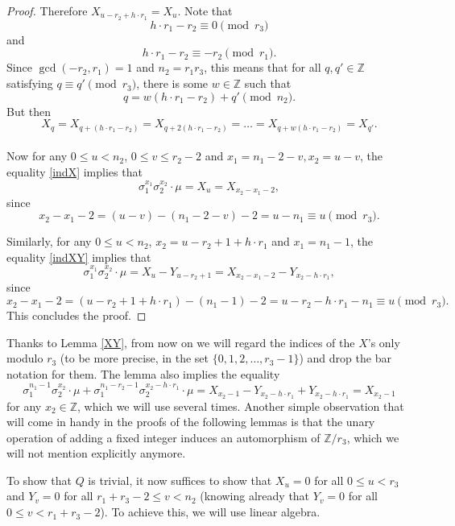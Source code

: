 \documentclass[12pt,a4paper]{article}
\theoremstyle{definition}
\newcommand{\Z}{\mathbb{Z}}
\begin{document}
\begin{proof}
Therefore $X_{u -r_2+h\cdot r_1}=X_u$. Note that $$h\cdot r_1-r_2\equiv 0 \pmod{r_3}$$ and $$h\cdot r_1-r_2\equiv -r_2\pmod{r_1}.$$ Since $\gcd(-r_2,r_1)=1$ and $n_2=r_1r_3$, this means that for all $q,q'\in\Z$ satisfying $q\equiv q'\pmod{r_3}$, there is some $w\in\Z$ such that $$q=w(h\cdot r_1-r_2)+q' \pmod{n_2}.$$ But then $$X_q=X_{q+(h\cdot r_1-r_2)}=X_{q+2(h\cdot r_1-r_2)}=\dots=X_{q+w(h\cdot r_1-r_2)}=X_{q'}.$$

\paragraph*{}
Now for any $0\leq u<n_2$, $0\leq v\leq r_2-2$ and $x_1=n_1-2-v,x_2=u-v$, the equality \eqref{indX} implies that $$\sigma_1^{x_1}\sigma_2^{x_2}\cdot \mu=X_u=X_{x_2-x_1-2},$$ since $$x_2-x_1-2=(u-v)-(n_1-2-v)-2=u-n_1\equiv u\pmod {r_3}.$$

Similarly, for any $0\leq u<n_2$, $x_2=u-r_2+1+h\cdot r_1$ and $x_1=n_1-1$, the equality \eqref{indXY} implies that 
$$\sigma_1^{x_1}\sigma_2^{x_2}\cdot \mu=X_u-Y_{u-r_2+1}=X_{x_2-x_1-2}-Y_{x_2-h\cdot r_1},$$ since 
$$x_2-x_1-2=(u-r_2+1+h\cdot r_1)-(n_1-1)-2=u-r_2-h\cdot r_1-n_1\equiv u \pmod{r_3}.$$
This concludes the proof.
\end{proof}

Thanks to Lemma \ref{XY}, from now on we will regard the indices of the $X$'s only modulo $r_3$ (to be more precise, in the set $\{0,1,2,\dots,r_3-1\}$) and drop the bar notation for them. The lemma also implies the equality
\begin{equation}\label{Ycancel}
\sigma_1^{n_1-1}\sigma_2^{x_2}\cdot \mu+\sigma_1^{n_1-r_2-1}\sigma_2^{x_2-h\cdot r_1}\cdot \mu=X_{x_2-1}-Y_{x_2-h\cdot r_1}+Y_{x_2-h\cdot r_1}= X_{x_2-1}
\end{equation}
for any $x_2\in\Z$, which we will use several times. Another simple observation that will come in handy in the proofs of the following lemmas is that the unary operation of adding a fixed integer induces an automorphism of $\Z/r_3$, which we will not mention explicitly anymore.

To show that $Q$ is trivial, it now suffices to show that $X_u=0$ for all $0\leq u< r_3$ and $Y_v=0$ for all $r_1+r_3-2\leq v< n_2$ (knowing already that  $Y_v = 0$ 
for all $0 \le v < r_1 +r_3 - 2$). To achieve this, we will use linear algebra.

%
\end{document}

